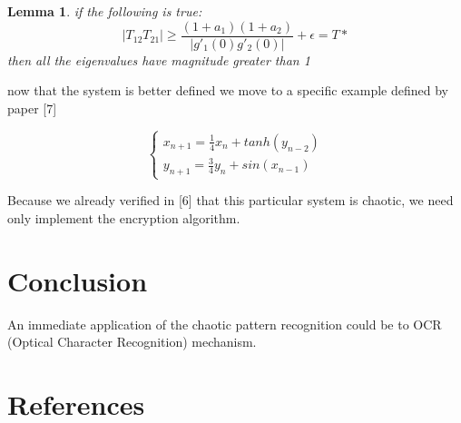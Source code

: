 \documentclass[12pt, letterpaper]{article}
\newtheorem{lemma}{Lemma}
\begin{document}
\begin{lemma} if the following is true:
\[
|T_{12}T_{21}| \geq \frac{(1+a_{1})(1 + a_{2})}{|g'_{1}(0)g'_{2}(0)|} + \epsilon = T*
\]
then all the eigenvalues have magnitude greater than 1
\end{lemma}

now that the system is better defined we move to a specific example defined by paper [7]

\[
    \begin{cases}
        x_{n+1} = \frac{1}{4}x_{n} + tanh(y_{n - 2})\\
        y_{n+1} = \frac{3}{4}y_{n} + sin(x_{n - 1})
    \end{cases}
\]

Because we already verified in [6] that this particular system is chaotic, we need only implement the encryption algorithm.

\section*{Conclusion}

An immediate application of the chaotic pattern recognition could be to OCR (Optical Character Recognition) mechanism.

\section*{References}

\fontsize{8}{12}\selectfont
\end{document}
